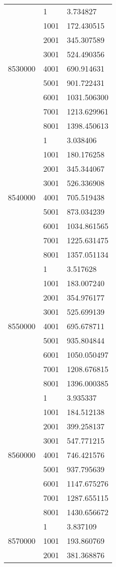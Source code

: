 \begin{table}[htb!]
\begin{tabular}{lll}
\multirow[c]{9}{*}{8530000} & 1 & 3.734827 \\
 & 1001 & 172.430515 \\
 & 2001 & 345.307589 \\
 & 3001 & 524.490356 \\
 & 4001 & 690.914631 \\
 & 5001 & 901.722431 \\
 & 6001 & 1031.506300 \\
 & 7001 & 1213.629961 \\
 & 8001 & 1398.450613 \\
\multirow[c]{9}{*}{8540000} & 1 & 3.038406 \\
 & 1001 & 180.176258 \\
 & 2001 & 345.344067 \\
 & 3001 & 526.336908 \\
 & 4001 & 705.519438 \\
 & 5001 & 873.034239 \\
 & 6001 & 1034.861565 \\
 & 7001 & 1225.631475 \\
 & 8001 & 1357.051134 \\
\multirow[c]{9}{*}{8550000} & 1 & 3.517628 \\
 & 1001 & 183.007240 \\
 & 2001 & 354.976177 \\
 & 3001 & 525.699139 \\
 & 4001 & 695.678711 \\
 & 5001 & 935.804844 \\
 & 6001 & 1050.050497 \\
 & 7001 & 1208.676815 \\
 & 8001 & 1396.000385 \\
\multirow[c]{9}{*}{8560000} & 1 & 3.935337 \\
 & 1001 & 184.512138 \\
 & 2001 & 399.258137 \\
 & 3001 & 547.771215 \\
 & 4001 & 746.421576 \\
 & 5001 & 937.795639 \\
 & 6001 & 1147.675276 \\
 & 7001 & 1287.655115 \\
 & 8001 & 1430.656672 \\
\multirow[c]{9}{*}{8570000} & 1 & 3.837109 \\
 & 1001 & 193.860769 \\
 & 2001 & 381.368876 \\

\end{tabular}
\end{table}
